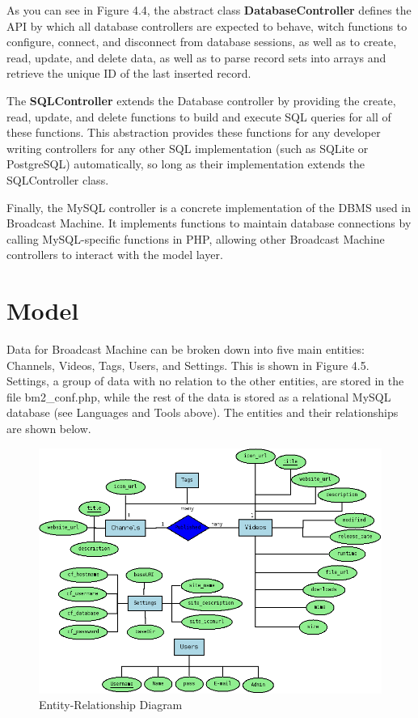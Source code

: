 \documentclass[a4paper,12pt]{report}
\begin{document}
As you can see in Figure 4.4, the abstract class \textbf{DatabaseController} defines the API by which all database controllers are expected to behave, witch functions to configure, connect, and disconnect from database sessions, as well as to create, read, update, and delete data, as well as to parse record sets into arrays and retrieve the unique ID of the last inserted record.

The \textbf{SQLController} extends the Database controller by providing the create, read, update, and delete functions to build and execute SQL queries for all of these functions. This abstraction provides these functions for any developer writing controllers for any other SQL implementation (such as SQLite or PostgreSQL) automatically, so long as their implementation extends the SQLController class.

Finally, the MySQL controller is a concrete implementation of the DBMS used in Broadcast Machine. It implements functions to maintain database connections by calling MySQL-specific functions in PHP, allowing other Broadcast Machine controllers to interact with the model layer.

\section{Model}
Data for Broadcast Machine can be broken down into five main entities: Channels, Videos, Tags, Users, and Settings. This is shown in Figure 4.5. Settings, a group of data with no relation to the other entities, are stored in the file bm2\_conf.php, while the rest of the data is stored as a relational MySQL database (see Languages and Tools above). The entities and their relationships are shown below.
\begin{figure}[htp]
\begin{center}
\includegraphics[scale=0.45]{./images/er.png}
\end{center}
\caption{Entity-Relationship Diagram}
\end{figure}
\end{document}
